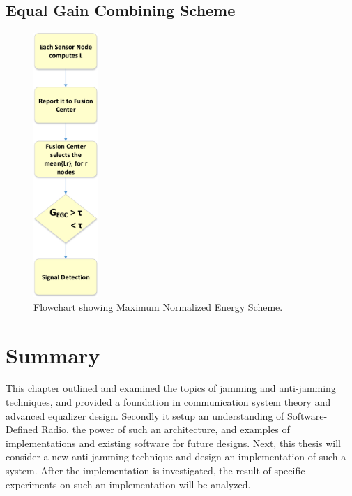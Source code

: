 \subsection{Equal Gain Combining Scheme}
\begin{figure}[ht!]
	\centering
	\includegraphics[width=\textwidth,height=10cm,keepaspectratio]{images/Gill/figs/egcscheme.eps}
\caption{Flowchart showing Maximum Normalized Energy Scheme.} 
\label{egcscheme}      
\end{figure}


\section{Summary}
This chapter outlined and examined the topics of jamming and anti-jamming techniques, and provided a foundation in communication system theory and advanced equalizer design.  Secondly it setup an understanding of Software-Defined Radio, the power of such an architecture, and examples of implementations and existing software for future designs.  Next, this thesis will consider a new anti-jamming technique and design an implementation of such a system.  After the implementation is investigated, the result of specific experiments on such an implementation will be analyzed.\\
